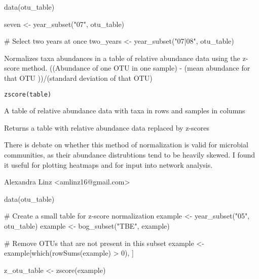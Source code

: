 \documentclass[a4paper]{book}
\begin{document}
%
\begin{Examples}
\begin{ExampleCode}
data(otu_table)

seven <- year_subset("07", otu_table)

# Select two years at once
two_years <- year_subset("07|08", otu_table)
\end{ExampleCode}
\end{Examples}
%
\begin{Description}\relax
Normalizes taxa abundances in a table of relative abundance data using the z-score method.
((Abundance of one OTU in one sample) - (mean abundance for that OTU ))/(standard deviation of that OTU)
\end{Description}
%
\begin{Usage}
\begin{verbatim}
zscore(table)
\end{verbatim}
\end{Usage}
%
\begin{Arguments}
\begin{ldescription}
\item[\code{table}] 
A table of relative abundance data with taxa in rows and samples in columns

\end{ldescription}
\end{Arguments}
%
\begin{Value}
Returns a table with relative abundance data replaced by z-scores
\end{Value}
%
\begin{Note}\relax
There is debate on whether this method of normalization is valid for microbial communities, as their abundance distrubtions tend to be heavily skewed.
I found it useful for plotting heatmaps and for input into network analysis.
\end{Note}
%
\begin{Author}\relax
Alexandra Linz <amlinz16@gmail.com>
\end{Author}
%
\begin{Examples}
\begin{ExampleCode}
data(otu_table)

# Create a small table for z-score normalization
example <- year_subset("05", otu_table)
example <- bog_subset("TBE", example)

# Remove OTUs that are not present in this subset
example <- example[which(rowSums(example) > 0), ]

z_otu_table <- zscore(example)
\end{ExampleCode}
\end{Examples}
\printindex{}
\end{document}
